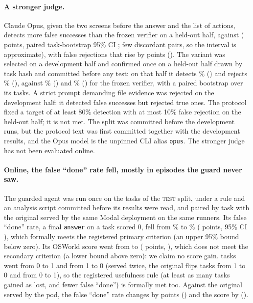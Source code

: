 
\paragraph{A stronger judge.} Claude Opus, given the two screens before the answer and the list of actions, detects more false successes than the frozen verifier on a held-out half, \gvTwoDet{} against \gvOneDet{} (\gvDetDiff{} points, paired task-bootstrap 95\% CI \gvDetDiffCi; few discordant pairs, so the interval is approximate), with false rejections that rise by \gvRejDiff{} points (\gvRejDiffCi). The variant was selected on a development half and confirmed once on a held-out half drawn by task hash and committed before any test: on that half it detects \gvTwoDetPct\% (\gvTwoDet) and rejects \gvTwoRejPct\% (\gvTwoRej), against \gvOneDetPct\% (\gvOneDet) and \gvOneRejPct\% (\gvOneRej) for the frozen verifier, with a paired bootstrap over its \gvTasks{} tasks. A strict prompt demanding file evidence was rejected on the development half: it detected \gvStrictDet{} false successes but rejected \gvStrictRej{} true ones. The protocol fixed a target of at least 80\% detection with at most 10\% false rejection on the held-out half; it is not met. The split was committed before the development runs, but the protocol text was first committed together with the development results, and the Opus model is the unpinned CLI alias \texttt{opus}. The stronger judge has not been evaluated online. %

\paragraph{Online, the false ``done'' rate fell, mostly in episodes the guard never saw.} The guarded agent was run once on the \OgN{} tasks of the \textsc{test} split, under a rule and an analysis script committed before its results were read, and paired by task with the original served by the same Modal deployment on the same runners. Its false ``done'' rate, a final \texttt{answer} on a task scored 0, fell from \OgFdBase\% to \OgFdGuard\% (\OgFdDiff{} points, 95\% CI \OgFdDiffCi), which formally meets the registered primary criterion (an upper 95\% bound below zero). Its OSWorld score went from \OgScoreBase{} to \OgScoreGuard{} (\OgScoreDiff{} points, \OgScoreDiffCi), which does not meet the secondary criterion (a lower bound above zero): we claim no score gain. \OgB{} tasks went from 0 to 1 and \OgC{} from 1 to 0 (served twice, the original flips \ogNoiseDown{} tasks from 1 to 0 and \ogNoiseUp{} from 0 to 1), so the registered usefulness rule (at least as many tasks gained as lost, and fewer false ``done'') is formally met too. Against the original served by the pod, the false ``done'' rate changes by \OgpodFdDiff{} points (\OgpodFdDiffCi) and the score by \OgpodScoreDiff{} (\OgpodScoreDiffCi).

